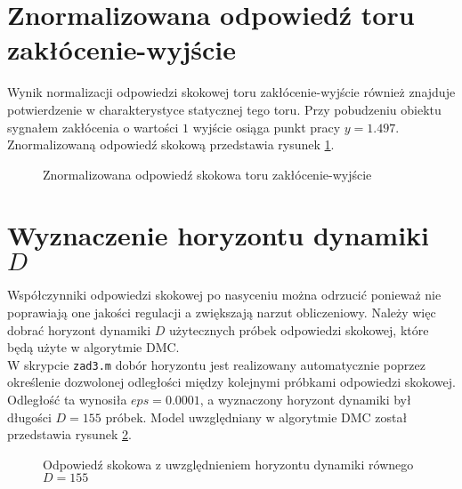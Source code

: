 \section{Znormalizowana odpowiedź toru zakłócenie-wyjście}
Wynik normalizacji odpowiedzi skokowej toru zakłócenie-wyjście również znajduje potwierdzenie w charakterystyce statycznej tego toru. Przy pobudzeniu obiektu sygnałem zakłócenia o wartości $\num{1}$ wyjście osiąga punkt pracy $y = \num{1,497}$. Znormalizowaną odpowiedź skokową przedstawia rysunek \ref{zad3_norm_odp_d}.

\begin{figure}[b]
    \centering
    \caption{Znormalizowana odpowiedź skokowa toru zakłócenie-wyjście}
    \label{zad3_norm_odp_d}
\end{figure}

\section{Wyznaczenie horyzontu dynamiki $D$}
Współczynniki odpowiedzi skokowej po nasyceniu można odrzucić ponieważ nie poprawiają one jakości regulacji a zwiększają narzut obliczeniowy. Należy więc dobrać horyzont dynamiki $D$ użytecznych próbek odpowiedzi skokowej, które będą użyte w algorytmie DMC.\\
\indent{} W skrypcie \verb+zad3.m+ dobór horyzontu jest realizowany automatycznie poprzez określenie dozwolonej odległości między kolejnymi próbkami odpowiedzi skokowej. Odległość ta wynosiła $eps = \num{0,0001}$, a wyznaczony horyzont dynamiki był długości $D = \num{155}$ próbek. Model uwzględniany w algorytmie DMC został przedstawia rysunek \ref{zad3_cut_resp}.

\begin{figure}[t]
    \centering
    \caption{Odpowiedź skokowa z uwzględnieniem horyzontu dynamiki równego $D = 155$}
    \label{zad3_cut_resp}
\end{figure}

